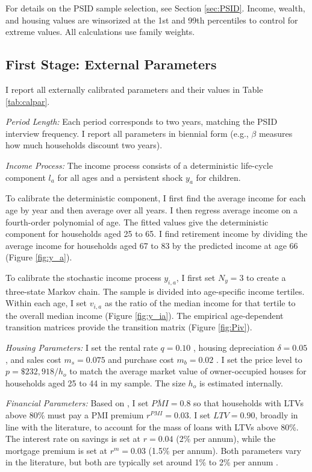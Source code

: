 \documentclass[12pt]{article}
\begin{document}
For details on the PSID sample selection, see Section \ref{sec:PSID}. Income, wealth, and housing values are winsorized at the 1st and 99th percentiles to control for extreme values. All calculations use family weights. 

\subsection{First Stage: External Parameters}
I report all externally calibrated parameters and their values in Table \ref{tab:calpar}.

\textit{Period Length:} Each period corresponds to two years, matching the PSID interview frequency. I report all parameters in biennial form (e.g., $\beta$ measures how much households discount two years).

\textit{Income Process:} The income process consists of a deterministic life-cycle component $l_a$ for all ages and a persistent shock $y_a$ for children. 

To calibrate the deterministic component, I first find the average income for each age by year and then average over all years. I then regress average income on a fourth-order polynomial of age. The fitted values give the deterministic component for households aged 25 to 65. I find retirement income by dividing the average income for households aged 67 to 83 by the predicted income at age 66 (Figure \ref{fig:y_a}). 

To calibrate the stochastic income process $y_{i,a}$, I first set $N_y=3$ to create a three-state Markov chain. The sample is divided into age-specific income tertiles. Within each age, I set $v_{i,a}$ as the ratio of the median income for that tertile to the overall median income (Figure \ref{fig:y_ia}). The empirical age-dependent transition matrices provide the transition matrix (Figure \ref{fig:Piv}).

\textit{Housing Parameters:} I set the rental rate $q=0.10$ \citep{Davis2008}, housing depreciation $\delta=0.05$ \citep{Harding2007}, and sales cost $m_s=0.075$ and purchase cost $m_b=0.02$ \citep{Yang2009}. I set the price level to $p=\$232,918/h_o$ to match the average market value of owner-occupied houses for households aged 25 to 44 in my sample. The size $h_o$ is estimated internally.

\textit{Financial Parameters:} Based on \cite{goodman2017sixty}, I set $\overline{PMI}=0.8$ so that households with LTVs above 80\% must pay a PMI premium $r^{PMI}=0.03$. I set $LTV=0.90$, broadly in line with the literature, to account for the mass of loans with LTVs above 80\%. The interest rate on savings is set at $r = 0.04$ (2\% per annum), while the mortgage premium is set at $r^m=0.03$ (1.5\% per annum). Both parameters vary in the literature, but both are typically set around 1\% to 2\% per annum \citep[see e.g.,][]{Cocco2005b,Kaplan2020,Paz-Pardo2019}.
\end{document}
